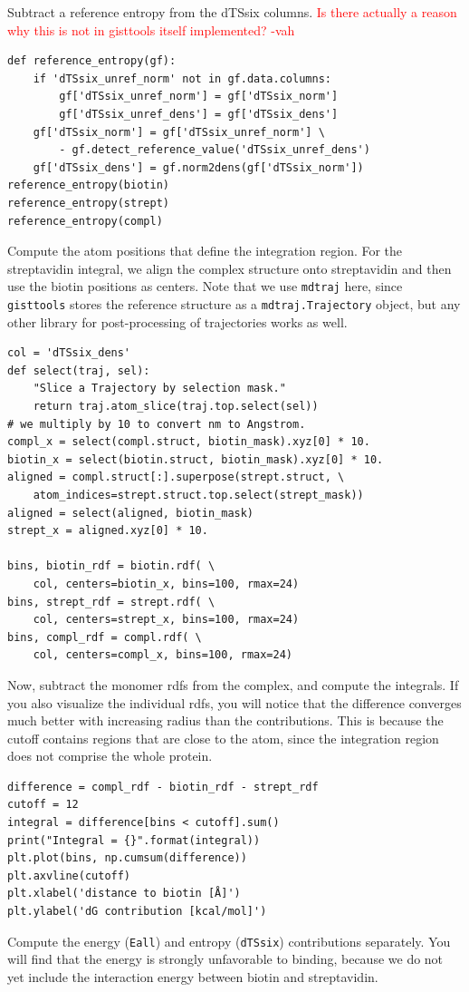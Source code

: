 \documentclass[9pt,tutorial]{livecoms}
\newcommand{\software}{\texttt}
\newcommand{\todo}{\textcolor{red}}
\newcommand\inlinecode{\texttt}
\begin{document}
Subtract a reference entropy from the dTSsix columns.
\todo{Is there actually a reason why this is not in gisttools itself implemented? -vah}
\begin{lstlisting}[style=python]
def reference_entropy(gf):
    if 'dTSsix_unref_norm' not in gf.data.columns:
        gf['dTSsix_unref_norm'] = gf['dTSsix_norm']
        gf['dTSsix_unref_dens'] = gf['dTSsix_dens']
    gf['dTSsix_norm'] = gf['dTSsix_unref_norm'] \
        - gf.detect_reference_value('dTSsix_unref_dens')
    gf['dTSsix_dens'] = gf.norm2dens(gf['dTSsix_norm'])
reference_entropy(biotin)
reference_entropy(strept)
reference_entropy(compl)
\end{lstlisting}

Compute the atom positions that define the integration region.
For the streptavidin integral, we align the complex structure onto streptavidin and then use the biotin positions as centers.
Note that we use \software{mdtraj} here, since \software{gisttools} stores the reference structure as a \inlinecode{mdtraj.Trajectory} object, but any other library for post-processing of trajectories works as well.
\begin{lstlisting}[style=python]
col = 'dTSsix_dens'
def select(traj, sel):
    "Slice a Trajectory by selection mask."
    return traj.atom_slice(traj.top.select(sel))
# we multiply by 10 to convert nm to Angstrom.
compl_x = select(compl.struct, biotin_mask).xyz[0] * 10.
biotin_x = select(biotin.struct, biotin_mask).xyz[0] * 10.
aligned = compl.struct[:].superpose(strept.struct, \
    atom_indices=strept.struct.top.select(strept_mask))
aligned = select(aligned, biotin_mask)
strept_x = aligned.xyz[0] * 10.

bins, biotin_rdf = biotin.rdf( \
    col, centers=biotin_x, bins=100, rmax=24)
bins, strept_rdf = strept.rdf( \
    col, centers=strept_x, bins=100, rmax=24)
bins, compl_rdf = compl.rdf( \
    col, centers=compl_x, bins=100, rmax=24)
\end{lstlisting}

Now, subtract the monomer rdfs from the complex, and compute the integrals.
If you also visualize the individual rdfs, you will notice that the difference converges much better with increasing radius than the contributions.
This is because the cutoff contains regions that are close to the atom, since the integration region does not comprise the whole protein.

\begin{lstlisting}[style=python]
difference = compl_rdf - biotin_rdf - strept_rdf
cutoff = 12
integral = difference[bins < cutoff].sum()
print("Integral = {}".format(integral))
plt.plot(bins, np.cumsum(difference))
plt.axvline(cutoff)
plt.xlabel('distance to biotin [Å]')
plt.ylabel('dG contribution [kcal/mol]')
\end{lstlisting}
Compute the energy (\inlinecode{Eall}) and entropy (\inlinecode{dTSsix}) contributions separately.
You will find that the energy is strongly unfavorable to binding, because we do not yet include the interaction energy between biotin and streptavidin.
\end{document}
